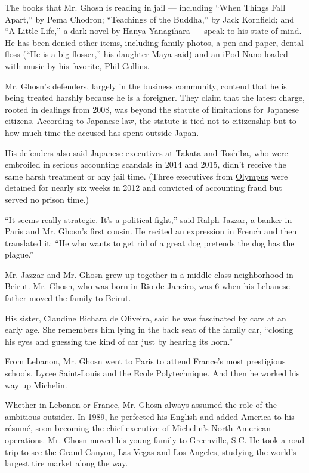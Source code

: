 The books that Mr. Ghosn is reading in jail --- including ``When Things
Fall Apart,'' by Pema Chodron; ``Teachings of the Buddha,'' by Jack
Kornfield; and ``A Little Life,'' a dark novel by Hanya Yanagihara ---
speak to his state of mind. He has been denied other items, including
family photos, a pen and paper, dental floss (``He is a big flosser,''
his daughter Maya said) and an iPod Nano loaded with music by his
favorite, Phil Collins.

Mr. Ghosn's defenders, largely in the business community, contend that
he is being treated harshly because he is a foreigner. They claim that
the latest charge, rooted in dealings from 2008, was beyond the statute
of limitations for Japanese citizens. According to Japanese law, the
statute is tied not to citizenship but to how much time the accused has
spent outside Japan.

His defenders also said Japanese executives at Takata and Toshiba, who
were embroiled in serious accounting scandals in 2014 and 2015, didn't
receive the same harsh treatment or any jail time. (Three executives
from
\href{https://www.nytimes.com/2011/11/10/business/global/corporate-japan-rocked-by-scandal-at-olympus.html?module=inline}{Olympus}
were detained for nearly six weeks in 2012 and convicted of accounting
fraud but served no prison time.)

``It seems really strategic. It's a political fight,'' said Ralph
Jazzar, a banker in Paris and Mr. Ghosn's first cousin. He recited an
expression in French and then translated it: ``He who wants to get rid
of a great dog pretends the dog has the plague.''

Mr. Jazzar and Mr. Ghosn grew up together in a middle-class neighborhood
in Beirut. Mr. Ghosn, who was born in Rio de Janeiro, was 6 when his
Lebanese father moved the family to Beirut.

His sister, Claudine Bichara de Oliveira, said he was fascinated by cars
at an early age. She remembers him lying in the back seat of the family
car, ``closing his eyes and guessing the kind of car just by hearing its
horn.''

From Lebanon, Mr. Ghosn went to Paris to attend France's most
prestigious schools, Lycee Saint-Louis and the Ecole Polytechnique. And
then he worked his way up Michelin.

Whether in Lebanon or France, Mr. Ghosn always assumed the role of the
ambitious outsider. In 1989, he perfected his English and added America
to his résumé, soon becoming the chief executive of Michelin's North
American operations. Mr. Ghosn moved his young family to Greenville,
S.C. He took a road trip to see the Grand Canyon, Las Vegas and Los
Angeles, studying the world's largest tire market along the way.


